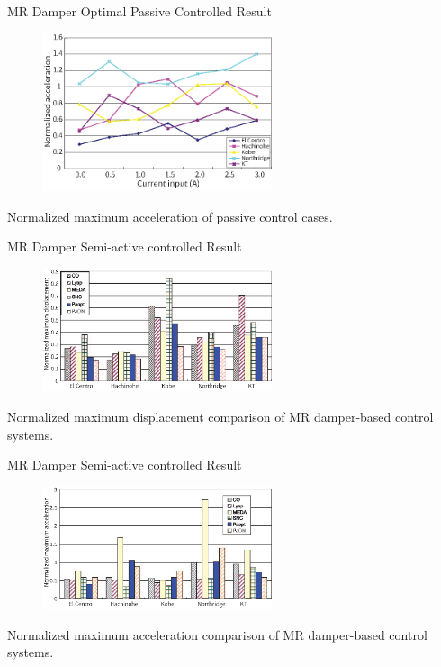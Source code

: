 \documentclass[usepdftitle=false]{beamer}
\begin{document}
\begin{frame}{MR Damper Optimal Passive Controlled Result}
\begin{figure}[!ht]
\centering
\includegraphics[width=0.6\textwidth] {figure/n3-13.eps}
\label{fig:n3-13}
\end{figure}
Normalized maximum acceleration of passive control cases.
\end{frame}



\begin{frame}{MR Damper Semi-active controlled Result}
\begin{figure}[!ht]
\centering
\includegraphics[width=0.6\textwidth] {figure/n3-14.eps}
\label{fig:n3-14}
\end{figure}
Normalized maximum displacement comparison of MR damper-based control systems.
\end{frame}

\begin{frame}{MR Damper Semi-active controlled Result}
\begin{figure}[!ht]
\centering
\includegraphics[width=0.6\textwidth] {figure/n3-15.eps}
\label{fig:n3-15}
\end{figure}
Normalized maximum acceleration comparison of MR damper-based control systems.
\end{frame}
\end{document}
